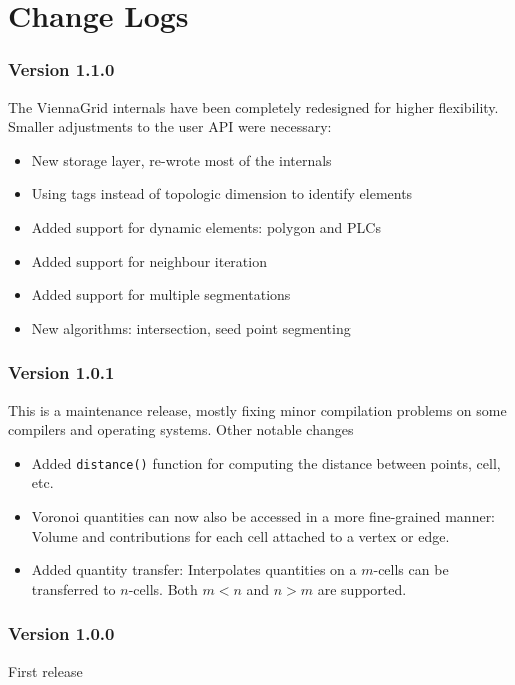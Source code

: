 
\chapter{Change Logs}

\subsection*{Version 1.1.0}
The ViennaGrid internals have been completely redesigned for higher flexibility.
Smaller adjustments to the user API were necessary:
\begin{itemize}
 \item New storage layer, re-wrote most of the internals
 \item Using tags instead of topologic dimension to identify elements
 \item Added support for dynamic elements: polygon and PLCs
 \item Added support for neighbour iteration
 \item Added support for multiple segmentations
 \item New algorithms: intersection, seed point segmenting
\end{itemize}

\subsection*{Version 1.0.1}
This is a maintenance release, mostly fixing minor compilation problems on some compilers and operating systems. Other notable changes
\begin{itemize}
  \item Added \lstinline|distance()| function for computing the distance between points, cell, etc.
  \item Voronoi quantities can now also be accessed in a more fine-grained manner: Volume and contributions for each cell attached to a vertex or edge.
  \item Added quantity transfer: Interpolates quantities on a $m$-cells can be transferred to $n$-cells. Both $m<n$ and $n>m$ are supported.
\end{itemize}

\subsection*{Version 1.0.0}
First release
